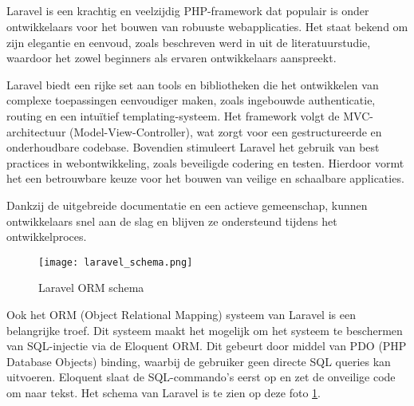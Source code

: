 \subsection{}
Laravel is een krachtig en veelzijdig PHP-framework dat populair is onder ontwikkelaars voor het bouwen van robuuste 
webapplicaties. Het staat bekend om zijn elegantie en eenvoud, zoals beschreven werd in  
uit de literatuurstudie, waardoor het zowel beginners als ervaren ontwikkelaars aanspreekt. 

Laravel biedt een rijke set aan tools en bibliotheken die het ontwikkelen van complexe toepassingen eenvoudiger 
maken, zoals ingebouwde authenticatie, routing en een intuïtief templating-systeem. Het framework volgt de MVC-architectuur 
(Model-View-Controller), wat zorgt voor een gestructureerde en onderhoudbare codebase. Bovendien stimuleert Laravel het 
gebruik van best practices in webontwikkeling, zoals beveiligde codering en testen. Hierdoor vormt het een betrouwbare keuze 
voor het bouwen van veilige en schaalbare applicaties. 

Dankzij de uitgebreide documentatie en een actieve gemeenschap, kunnen 
ontwikkelaars snel aan de slag en blijven ze ondersteund tijdens het ontwikkelproces.

\begin{figure}
    \centering
    \texttt{[image: laravel\_schema.png]}
    \caption[Laravel ORM schema]{Laravel ORM schema ~\autocite{2020}}
    \label{fig:laravel_schema}
\end{figure}

Ook het ORM (Object Relational Mapping) systeem van Laravel is een belangrijke troef. Dit systeem maakt het mogelijk om 
het systeem te beschermen van SQL-injectie via de Eloquent ORM. Dit gebeurt door middel van PDO (PHP Database Objects) binding, waarbij de
gebruiker geen directe SQL queries kan uitvoeren. Eloquent slaat de SQL-commando's eerst op en zet de onveilige code om 
naar tekst. Het schema van Laravel is te zien op deze foto \ref{fig:laravel_schema}.
